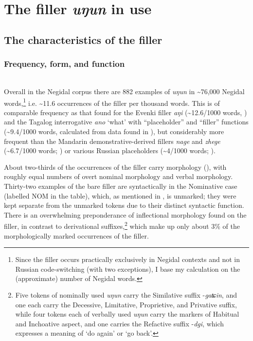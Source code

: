\documentclass[output=paper]{langscibook}
\begin{document}
\section{The filler \textit{uŋun} in use}
\label{sec:pakendorf:4}
\subsection{The characteristics of the filler}
\label{sec:pakendorf:4.1}
\subsubsection{Frequency, form, and function}
\label{sec:pakendorf:4.1.1.1}
~\\
Overall in the Negidal corpus there are 882 examples of \textit{uŋun} in {\textasciitilde}76,000 Negidal words,\footnote{Since the filler occurs practically exclusively in Negidal contexts and not in Russian code-switching (with two exceptions), I base my calculation on the (approximate) number of Negidal words.} i.e. {\textasciitilde}11.6 occurrences of the filler per thousand words. This is of comparable frequency as that found for the Evenki filler \textit{aŋi} ({\textasciitilde}12.6/1000 words, \citealt[213]{Klyachko2022}) and the Tagalog interrogative \textit{ano} ‘what’ with “placeholder” and “filler” functions ({\textasciitilde}9.4/1000 words, calculated from data found in \citealt[94, 105]{Nagaya2022}), but considerably more frequent than the Mandarin demonstrative-derived fillers \textit{nage} and \textit{zhege} ({\textasciitilde}6.7/1000 words; \citealt{ZhaoZhao2005}) or various Russian placeholders ({\textasciitilde}4/1000 words; \citealt[186]{PodlesskayaPodlesskaya2009}). 

About two-thirds of the occurrences of the filler carry morphology (), with roughly equal numbers of overt nominal morphology and verbal morphology. Thirty-two examples of the bare filler are syntactically in the Nominative case (labelled NOM in the table), which, as mentioned in , is unmarked; they were kept separate from the unmarked tokens due to their distinct syntactic function. There is an overwhelming preponderance of inflectional morphology found on the filler, in contrast to derivational suffixes,\footnote{Five tokens of nominally used \textit{uŋun} carry the Similative suffix -\textit{gaʨin}, and one each carry the Decessive, Limitative, Proprietive, and Privative suffix, while four tokens each of verbally used \textit{uŋun} carry the markers of Habitual and Inchoative aspect, and one carries the Refactive suffix -\textit{dgi}, which expresses a meaning of ‘do again’ or ‘go back’.} which make up only about 3\% of the morphologically marked occurrences of the filler. 
\end{document}
